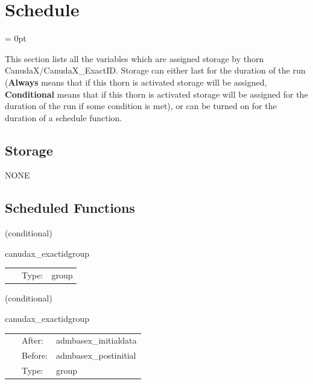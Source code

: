 
\section{Schedule} 


\parskip = 0pt


\noindent This section lists all the variables which are assigned storage by thorn CanudaX/CanudaX\_ExactID.  Storage can either last for the duration of the run ({\bf Always} means that if this thorn is activated storage will be assigned, {\bf Conditional} means that if this thorn is activated storage will be assigned for the duration of the run if some condition is met), or can be turned on for the duration of a schedule function.


\subsection*{Storage}NONE
\subsection*{Scheduled Functions}
\vspace{5mm}

   (conditional) 

\hspace{5mm} canudax\_exactidgroup 

\hspace{5mm}{\it canudax\_exactid group for setting up initial data } 


\hspace{5mm}

 \begin{tabular*}{160mm}{cll} 
~ & Type:  & group \\ 
\end{tabular*} 


\vspace{5mm}

   (conditional) 

\hspace{5mm} canudax\_exactidgroup 

\hspace{5mm}{\it canudax\_exactid group for setting up initial data } 


\hspace{5mm}

 \begin{tabular*}{160mm}{cll} 
~ & After:  & admbasex\_initialdata \\ 
~ & Before:  & admbasex\_postinitial \\ 
~ & Type:  & group \\ 
\end{tabular*} 


